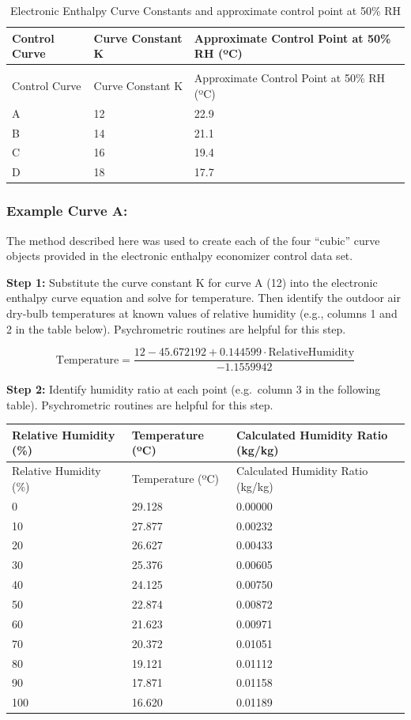 \begin{longtable}[c]{p{1.5in}p{1.5in}p{3.0in}}
\caption{Electronic Enthalpy Curve Constants and approximate control point at 50\% RH \label{table:electronic-enthalpy-curve-constants}} \tabularnewline
\toprule 
Control Curve & Curve Constant K & Approximate Control Point at 50\% RH (ºC) \tabularnewline
\midrule
\endfirsthead

\caption[]{Electronic Enthalpy Curve Constants and approximate control point at 50\% RH} \tabularnewline
\toprule 
Control Curve & Curve Constant K & Approximate Control Point at 50\% RH (ºC) \tabularnewline
\midrule
\endhead

A & 12 & 22.9 \tabularnewline
B & 14 & 21.1 \tabularnewline
C & 16 & 19.4 \tabularnewline
D & 18 & 17.7 \tabularnewline
\bottomrule
\end{longtable}

\subsubsection{Example Curve A:}\label{example-curve-a}

The method described here was used to create each of the four ``cubic'' curve objects provided in the electronic enthalpy economizer control data set.

\textbf{Step 1:} Substitute the curve constant K for curve A (12) into the electronic enthalpy curve equation and solve for temperature. Then identify the outdoor air dry-bulb temperatures at known values of relative humidity (e.g., columns 1 and 2 in the table below). Psychrometric routines are helpful for this step.

\begin{equation}
\text{Temperature} = \frac{12 - 45.672192 + 0.144599 \cdot \text{RelativeHumidity}}{-1.1559942}
\end{equation}

\textbf{Step 2:} Identify humidity ratio at each point (e.g.~column 3 in the following table). Psychrometric routines are helpful for this step.

\begin{longtable}[c]{p{1.78in}p{1.5in}p{2.71in}}
\toprule 
Relative Humidity (\%) & Temperature (ºC) & Calculated Humidity Ratio (kg/kg) \tabularnewline
\midrule
\endfirsthead

\toprule 
Relative Humidity (\%) & Temperature (ºC) & Calculated Humidity Ratio (kg/kg) \tabularnewline
\midrule
\endhead

0 & 29.128 & 0.00000 \tabularnewline
10 & 27.877 & 0.00232 \tabularnewline
20 & 26.627 & 0.00433 \tabularnewline
30 & 25.376 & 0.00605 \tabularnewline
40 & 24.125 & 0.00750 \tabularnewline
50 & 22.874 & 0.00872 \tabularnewline
60 & 21.623 & 0.00971 \tabularnewline
70 & 20.372 & 0.01051 \tabularnewline
80 & 19.121 & 0.01112 \tabularnewline
90 & 17.871 & 0.01158 \tabularnewline
100 & 16.620 & 0.01189 \tabularnewline
\bottomrule
\end{longtable}

